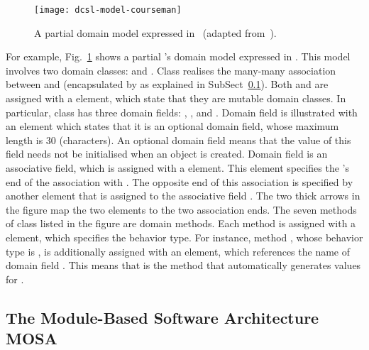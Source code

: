 %
\begin{figure}[ht]
	\centering
	\texttt{[image: dcsl-model-courseman]}
	\caption{A partial \courseman domain model expressed in \dcsl~(adapted from~\cite{le_domain_2018}).}
	\label{fig:dcsl_courseman}
\end{figure}

For example, Fig.~\ref{fig:dcsl_courseman} shows a partial \courseman's domain model expressed in \dcsl. This model involves two domain classes:  and . Class  realises the many-many association between  and  (encapsulated by  as explained in SubSect~\ref{sect:bg-arch}). Both  and  are assigned with a  element, which state that they are mutable domain classes. In particular, class  has three domain fields: , , and . Domain field  is illustrated with an  element which states that it is an optional domain field, whose maximum length is 30 (characters). An optional domain field means that the value of this field needs not be initialised when an object is created. Domain field  is an associative field, which is assigned with a  element. This element specifies the 's end of the association with . The opposite end of this association is specified by another  element that is assigned to the associative field . The two thick arrows in the figure map the two  elements to the two association ends. 
%
The seven methods of class  listed in the figure are domain methods. Each method is assigned with a  element, which specifies the behavior type. For instance, method , whose behavior type is , is additionally assigned with an  element, which references the name of domain field . This means that  is the method that automatically generates values for .

\subsection{The Module-Based Software Architecture MOSA}
\label{sect:bg-arch} %

